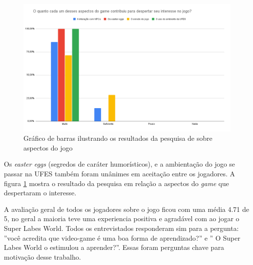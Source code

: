 \begin{figure}[h!]
    \centering
    \includegraphics[width=1\linewidth]{figuras/graph-3.png}
    \caption{Gráfico de barras ilustrando os resultados da pesquisa de sobre aspectos do jogo}
    \label{fig:graph-3}
\end{figure}

Os \textit{easter eggs} (segredos de caráter humorísticos), e a ambientação do jogo se passar na UFES também foram unânimes em aceitação entre os jogadores. A figura \ref{fig:graph-3} mostra o resultado da pesquisa em relação a aspectos do \textit{game} que despertaram o interesse. 

\clearpage
A avaliação geral de todos os jogadores sobre o jogo ficou com uma média 4.71 de 5, no geral a maioria teve uma experiencia positiva e agradável com ao jogar o Super Labes World. Todos os entrevistados responderam sim para a pergunta: ''você acredita que video-game é uma boa forma de aprendizado?'' e  '' O Super Labes World o estimulou a aprender?''. Essas foram perguntas chave para motivação desse trabalho. 

